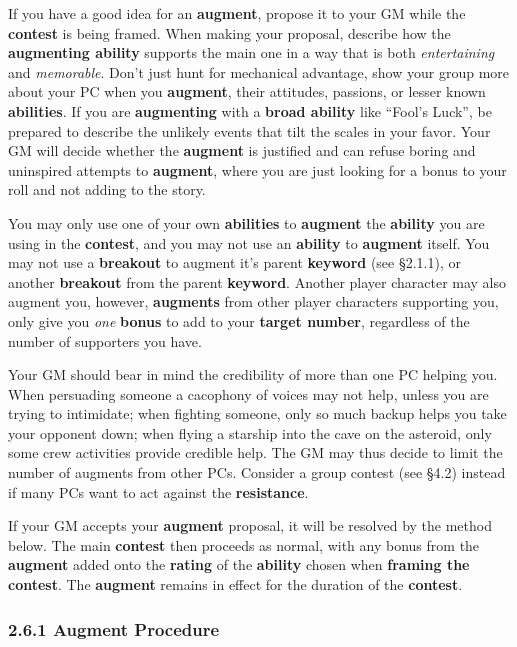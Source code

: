 \documentclass[
  11pt,
]{article}
\begin{document}
If you have a good idea for an \textbf{augment}, propose it to your GM
while the \textbf{contest} is being framed. When making your proposal,
describe how the \textbf{augmenting ability} supports the main one in a
way that is both \emph{entertaining} and \emph{memorable}. Don't just
hunt for mechanical advantage, show your group more about your PC when
you \textbf{augment}, their attitudes, passions, or lesser known
\textbf{abilities}. If you are \textbf{augmenting} with a \textbf{broad
ability} like ``Fool's Luck'', be prepared to describe the unlikely
events that tilt the scales in your favor. Your GM will decide whether
the \textbf{augment} is justified and can refuse boring and uninspired
attempts to \textbf{augment}, where you are just looking for a bonus to
your roll and not adding to the story.

You may only use one of your own \textbf{abilities} to \textbf{augment}
the \textbf{ability} you are using in the \textbf{contest}, and you may
not use an \textbf{ability} to \textbf{augment} itself. You may not use
a \textbf{breakout} to augment it's parent \textbf{keyword} (see
§2.1.1), or another \textbf{breakout} from the parent \textbf{keyword}.
Another player character may also augment you, however,
\textbf{augments} from other player characters supporting you, only give
you \emph{one} \textbf{bonus} to add to your \textbf{target number},
regardless of the number of supporters you have.

Your GM should bear in mind the credibility of more than one PC helping
you. When persuading someone a cacophony of voices may not help, unless
you are trying to intimidate; when fighting someone, only so much backup
helps you take your opponent down; when flying a starship into the cave
on the asteroid, only some crew activities provide credible help. The GM
may thus decide to limit the number of augments from other PCs. Consider
a group contest (see §4.2) instead if many PCs want to act against the
\textbf{resistance}.

If your GM accepts your \textbf{augment} proposal, it will be resolved
by the method below. The main \textbf{contest} then proceeds as normal,
with any bonus from the \textbf{augment} added onto the \textbf{rating}
of the \textbf{ability} chosen when \textbf{framing the contest}. The
\textbf{augment} remains in effect for the duration of the
\textbf{contest}.

\hypertarget{augment-procedure}{%
\subsubsection{2.6.1 Augment Procedure}\label{augment-procedure}}
\end{document}
